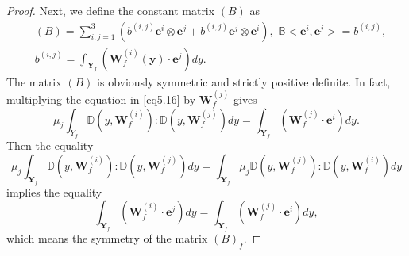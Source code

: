 \documentclass[10pt,a4paper]{amsart}
\begin{document}
\begin{proof}
Next, we define the constant matrix $(B)$ as
\begin{equation}\label{eq5.16}
\begin{aligned}
& 
(B)=\sum_{i,j=1}^{3}({b}^{(i,j)}\boldsymbol{e}^{i}\otimes\boldsymbol{e}^{j}+
{b}^{(i,j)}\boldsymbol{e}^{j}\otimes\boldsymbol{e}^{i}),\,\,
\mathbb{B}<\boldsymbol{e}^{i},\boldsymbol{e}^{j}>={b}^{(i,j)},
\\
& {b}^{(i,j)}=
\int_{\textbf{Y}_{f}}(\boldsymbol{W}_{f}^{(i)}(\boldsymbol{y})\cdot\boldsymbol{e}^{j})dy.
\end{aligned}
\end{equation}
The matrix $(B)$ is obviously symmetric and strictly positive definite.
In fact, multiplying the equation in \eqref{eq5.16} by $\boldsymbol{W}_{f}^{(j)}$ gives
\begin{equation*}
\mu_{j}\int_{{Y}_{f}}\mathbb{D}(y,\boldsymbol{W}_{f}^{(i)}):
\mathbb{D}(y,\boldsymbol{W}_{f}^{(j)})dy=
\int_{\textbf{Y}_{f}}(\boldsymbol{W}_{f}^{(j)}\cdot\boldsymbol{e}^{i})dy.
\end{equation*}
Then the equality
\begin{equation*}
\mu_{j}\int_{\textbf{Y}_{f}}\mathbb{D}(y,\boldsymbol{W}_{f}^{(i)}):
\mathbb{D}(y,\boldsymbol{W}_{f}^{(j)})dy=
\int_{\textbf{Y}_{f}}\mu_{j}\mathbb{D}(y,\boldsymbol{W}_{f}^{(j)}):
\mathbb{D}(y,\boldsymbol{W}_{f}^{(i)})dy
\end{equation*}
implies the equality
\begin{equation}\label{eq5.17}
\int_{\textbf{Y}_{f}}(\boldsymbol{W}_{f}^{(i)}\cdot\boldsymbol{e}^{j})dy=
\int_{\textbf{Y}_{f}}(\boldsymbol{W}_{f}^{(j)}\cdot\boldsymbol{e}^{i})dy,
\end{equation}
which means the symmetry of the matrix $(B)_{f}$.


\end{proof}
\end{document}
